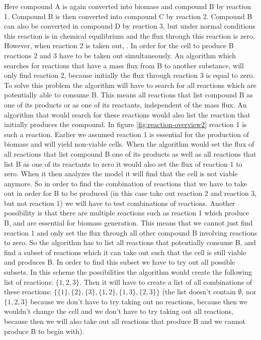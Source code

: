 \documentclass[12pt]{report}
\begin{document}
Here compound A is again converted into biomass and compound B by reaction 1. Compound B is then converted into compound C by reaction 2. Compound B can also be converted in compound D by reaction 3, but under normal conditions this reaction is in chemical equilibrium and the flux through this reaction is zero. However, when reaction 2 is taken out, .
In order for the cell to produce B reactions 2 and 3 have to be taken out simultaneously.
An algorithm which searches for reactions that have a mass flux from B to another substance, will only find reaction 2, because initially the flux through reaction 3 is equal to zero. 
To solve this problem the algorithm will have to search for all reactions which are potentially able to consume B. This means all reactions that list compound B as one of its products or as one of its reactants, independent of the mass flux.
An algorithm that would search for these reactions would also list the reaction that initially produces the compound. In figure \ref{fig:reaction-overview2} reaction 1 is such a reaction.
Earlier we assumed reaction 1 is essential for the production of biomass and will yield non-viable cells.
When the algorithm would set the flux of all reactions that list compound B one of its products as well as all reactions that list B as one of its reactants to zero it would also set the flux of reaction 1 to zero. When it then analyzes the model it will find that the cell is not viable anymore. So in order to find the combination of reactions that we have to take out in order for B to be produced (in this case take out reaction 2 and reaction 3, but not reaction 1) we will have to test combinations of reactions.
Another possibility is that there are multiple reactions such as reaction 1 which produce B, and are essential for biomass generation.
This means that we cannot just find reaction 1 and only set the flux through all other compound B involving reactions to zero.
So the algorithm has to list all reactions that potentially consume B, and find a subset of reactions which it can take out such that the cell is still viable and produces B.
In order to find this subset we have to try out all possible subsets. In this scheme the possibilities the algorithm would create the following list of reactions: $\{1, 2, 3\}$.
Then it will have to create a list of all combinations of these reactions: $\{\{1\},\{2\},\{3\},\{1,2\},\{1,3\},\{2,3\}\}$ (the list doesn't contain $\emptyset$, nor $\{1,2,3\}$ because we don't have to try taking out no reactions, because then we wouldn't change the cell and we don't have to try taking out all reactions, because then we will also take out all reactions that produce B and we cannot produce B to begin with).
\end{document}
